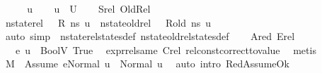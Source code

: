 \begin{isabellebody}
\isamarkupfalse%
\ {\isacharminus}{\kern0pt}\isanewline
\ \ \isamarkupfalse%
\ u\isanewline
\ \ \isamarkupfalse%
\ {\isachardoublequoteopen}u\ {\isasymin}\ U{\isachardoublequoteclose}\isanewline
\ \ \isamarkupfalse%
\ Srel\ OldRel\ \isamarkupfalse%
\ {\isachardoublequoteopen}nstate{\isacharunderscore}{\kern0pt}rel\ {\isasymLambda}\ {\isasymLambda}{\isacharprime}{\kern0pt}\ R\ ns\ u{\isachardoublequoteclose}\ \ {\isachardoublequoteopen}nstate{\isacharunderscore}{\kern0pt}old{\isacharunderscore}{\kern0pt}rel\ {\isasymLambda}\ {\isasymLambda}{\isacharprime}{\kern0pt}\ R{\isacharunderscore}{\kern0pt}old\ ns\ u{\isachardoublequoteclose}\ \ \ \ \isanewline
\ \ \ \ \ \ \isamarkupfalse%
\ {\isacharparenleft}{\kern0pt}auto\ simp{\isacharcolon}{\kern0pt}\ \ nstate{\isacharunderscore}{\kern0pt}rel{\isacharunderscore}{\kern0pt}states{\isacharunderscore}{\kern0pt}def\ nstate{\isacharunderscore}{\kern0pt}old{\isacharunderscore}{\kern0pt}rel{\isacharunderscore}{\kern0pt}states{\isacharunderscore}{\kern0pt}def{\isacharparenright}{\kern0pt}\isanewline
\ \ \isamarkupfalse%
\ Ared\ Erel\ \isamarkupfalse%
\ {\isachardoublequoteopen}{\isasymLambda}{\isacharprime}{\kern0pt}{\isacharcomma}{\kern0pt}{\isasymGamma}{\isacharcomma}{\kern0pt}{\isasymOmega}\ {\isasymturnstile}\ {\isasymlangle}e{}{\isacharcomma}{\kern0pt}\ u{\isasymrangle}\ {\isasymDown}\ {\isacharparenleft}{\kern0pt}BoolV\ True{\isacharparenright}{\kern0pt}{\isachardoublequoteclose}\ \isamarkupfalse%
\ expr{\isacharunderscore}{\kern0pt}rel{\isacharunderscore}{\kern0pt}same{\isacharparenleft}{\kern0pt}{}{\isacharparenright}{\kern0pt}\ Crel\ rel{\isacharunderscore}{\kern0pt}const{\isacharunderscore}{\kern0pt}correct{\isacharunderscore}{\kern0pt}to{\isacharunderscore}{\kern0pt}value\ \isamarkupfalse%
\ metis\isanewline
\ \ \isamarkupfalse%
\ {\isachardoublequoteopen}M{\isacharcomma}{\kern0pt}{\isasymLambda}{\isacharprime}{\kern0pt}{\isacharcomma}{\kern0pt}{\isasymGamma}{\isacharcomma}{\kern0pt}{\isasymOmega}\ {\isasymturnstile}\ {\isasymlangle}Assume\ e{}{\isacharcomma}{\kern0pt}Normal\ u{\isasymrangle}\ {\isasymrightarrow}\ Normal\ u{\isachardoublequoteclose}\ \isamarkupfalse%
\ {\isacharparenleft}{\kern0pt}auto\ intro{\isacharcolon}{\kern0pt}\ RedAssumeOk{\isacharparenright}{\kern0pt}\isanewline
{}\isamarkupfalse%

\end{isabellebody}
